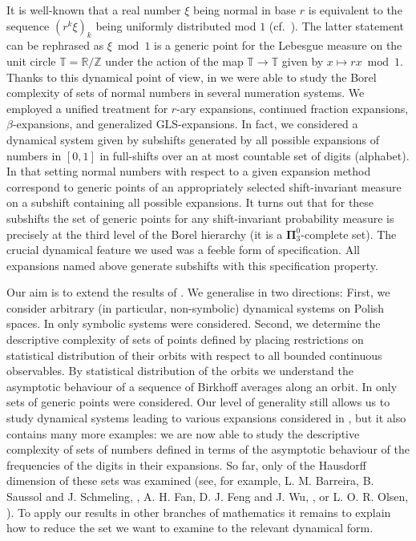 \documentclass{amsart}
\theoremstyle{definition}
\newcommand{\base}{r}
\newcommand{\bp}{\boldsymbol{\Pi}}
\begin{document}
It is well-known that a real number $\xi$ being normal in base $\base$ is equivalent to
the sequence $(\base^k \xi)_k $ being uniformly distributed  mod $1$
(cf.\ \cite{KuN}). The latter statement can be rephrased as $\xi\bmod 1$ is a generic point for the Lebesgue measure on the unit circle $\mathbb{T}=\mathbb{R}/\mathbb{Z}$ under the action of the map $\mathbb{T}\to\mathbb{T}$ given by $x\mapsto \base x\bmod 1$.
Thanks to this dynamical point of view, in \cite{AJKM} we were able to study the Borel complexity of sets of normal numbers in several numeration systems. We employed
a unified treatment for $\base$-ary expansions, continued fraction expansions, $\beta$-expansions, and generalized GLS-expansions. In fact, we considered a dynamical system given by subshifts generated by all possible expansions of numbers in $[0,1]$ in full-shifts over an at most countable set of digits (alphabet). In that setting normal numbers with respect to a given expansion method correspond to generic points of an appropriately selected shift-invariant measure on a subshift containing all possible expansions. It turns out that for these subshifts the set of generic points for any shift-invariant probability measure is precisely at the third level of the Borel hierarchy (it is a $\bp^0_3$-complete set). The crucial dynamical feature we used was a feeble form of specification. All expansions named above generate subshifts with this specification property.

Our aim is to extend the results of \cite{AJKM}. We generalise \cite{AJKM} in two directions: First, we consider arbitrary (in particular, non-symbolic)  dynamical systems on Polish spaces. In \cite{AJKM} only symbolic systems were considered. Second, we determine the descriptive complexity of sets of points defined by placing restrictions on statistical distribution of their orbits with respect to all bounded continuous observables. By statistical distribution of the orbits we understand the asymptotic behaviour of a sequence of Birkhoff averages along an orbit. In \cite{AJKM} only sets of generic points were considered. Our level of generality still allows us to study dynamical systems leading to various expansions considered  in \cite{AJKM}, but it also contains many more examples: we are now able to study the descriptive complexity of sets of numbers defined in terms of the asymptotic behaviour of the frequencies of the digits in their expansions. So far, only of the Hausdorff dimension of these sets was examined (see, for example, L. M. Barreira, B. Saussol and J. Schmeling, \cite{BSS}, A. H. Fan, D. J. Feng and J. Wu, \cite{FFW}, or L. O. R. Olsen, \cite{Olsen}). To apply our results in other branches of mathematics it remains  to explain how to reduce the set we want to examine to the relevant dynamical form.
\end{document}
